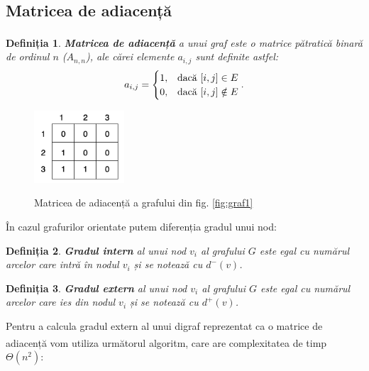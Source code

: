 \documentclass[9pt,a4paper]{report}
\newtheorem{definitie}{Definiția}
\begin{document}
\subsection{Matricea de adiacență}

\begin{definitie}
    \textbf{Matricea de adiacență}\textsuperscript{\cite{milosescu}} a unui graf este o matrice pătratică binară de ordinul $n$ ($A_{n,n}$), ale cărei elemente $a_{i,j}$ sunt definite astfel:
    $$
        a_{i,j} =
        \begin{cases}
            1, & \text{\normalfont{dacă }} [i, j] \in E    \\
            0, & \text{\normalfont{dacă }} [i, j] \notin E \\
        \end{cases}.
    $$
\end{definitie}

\begin{figure}[htbp]
    \centering
    \includegraphics[width=0.3\textwidth]{img/adjacency_matrix.png}
    \label{fig:graf3}
    \caption{Matricea de adiacență a grafului din fig. \ref{fig:graf1}}
\end{figure}

În cazul grafurilor orientate putem diferenția gradul unui nod:
\begin{definitie}
    \textbf{Gradul intern} al unui nod $v_i$ al grafului $G$ este egal cu numărul arcelor care intră în nodul $v_i$ și se notează cu $d^-(v)$.
\end{definitie}
\begin{definitie}
    \textbf{Gradul extern} al unui nod $v_i$ al grafului $G$ este egal cu numărul arcelor care ies din nodul $v_i$ și se notează cu $d^+(v)$.
\end{definitie}

Pentru a calcula gradul extern al unui digraf reprezentat ca o matrice de adiacență vom utiliza următorul algoritm\textsuperscript{\cite{gabow}}, care are complexitatea de timp $\Theta(n^2)$:

\begin{algorithm}
    \begin{algorithmic}
        \EndFor
        \EndFor
        \EndProcedure
    \end{algorithmic}
\end{algorithm}
\end{document}
